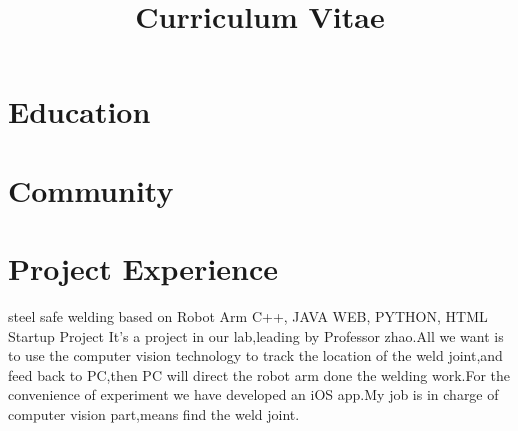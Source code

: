\documentclass[11pt,a4paper]{moderncv}
\title{Curriculum Vitae}
\begin{document}
\maketitle

\section{Education}



\section{Community}

\section{Project Experience}

{steel safe welding based on Robot Arm}
{C++, JAVA WEB, PYTHON, HTML}
{Startup Project}{}
{It's a project in our lab,leading by Professor zhao.All we want is to use the computer vision technology to track the location of the weld joint,and feed back to PC,then PC will direct the robot arm done the welding work.For the convenience of experiment we have developed an iOS app.My job is in charge of computer vision part,means find the weld joint.}
\end{document}
